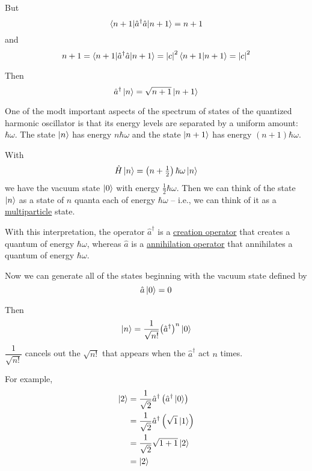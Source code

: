 \documentclass{article}
\begin{document}

\noindent But
\begin{equation*}
\braket{ n+1 | \hat{a}^\dagger \hat{a} | n+1 } = n + 1
\end{equation*}
and
\begin{equation*}
n + 1 = \braket{ n+1 | \hat{a}^\dagger \hat{a} | n+1 } = {|c|}^2 \braket{ n+1 | n+1 } = {|c|}^2
\end{equation*}

\noindent Then
\begin{equation*}
    \hat{a}^\dagger \ket{n} = \sqrt{n+1} \ket{n+1}
\end{equation*}

\noindent One of the modt important aspects of the spectrum of states of the quantized harmonic oscillator is that its energy levels are separated by a uniform amount: $\hbar \omega$. The state $\ket{n}$ has energy $n \hbar \omega$ and the state $\ket{n+1}$ has energy $(n+1) \hbar \omega$.

\noindent With
\begin{equation*}
    \hat{H} \ket{n} = \left( n + \tfrac{1}{2} \right) \hbar \omega \ket{n}
\end{equation*}
we have the vacuum state $\ket{0}$ with energy $\tfrac{1}{2} \hbar \omega$. Then we can think of the state $\ket{n}$ as a state of $n$ quanta each of energy $\hbar \omega$ -- i.e., we can think of it as a \underline{multiparticle} state.

\noindent With this interpretation, the operator $\hat{a}^\dagger$ is a \underline{creation operator} that creates a quantum of energy $\hbar \omega$, whereas $\hat{a}$ is a \underline{annihilation operator} that annihilates a quantum of energy $\hbar \omega$.


\noindent Now we can generate all of the states beginning with the vacuum state defined by
\begin{equation*}
    \hat{a} \ket{0} = 0
\end{equation*}

\noindent Then
\begin{equation*}
    \ket{n} = \dfrac{1}{\sqrt{n!}} {\left( \hat{a}^\dagger \right)}^n \ket{0}
\end{equation*}
$\dfrac{1}{\sqrt{n!}}$ cancels out the $\sqrt{n!}$ that appears when the $\hat{a}^\dagger$ act $n$ times.

\noindent For example,
\begin{align*}
    \ket{2} &= \dfrac{1}{\sqrt{2}} \hat{a}^\dagger \left( \hat{a}^\dagger \ket{0} \right) \\
    &= \dfrac{1}{\sqrt{2}} \hat{a}^\dagger \left( \sqrt{1} \ket{1} \right) \\
    &= \dfrac{1}{\sqrt{2}} \sqrt{1+1} \ket{2} \\
    &= \ket{2}
\end{align*}
\end{document}
